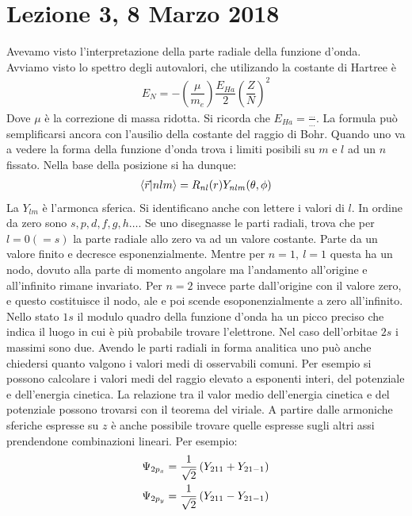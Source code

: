 \documentclass[../AppuntiStruttura.tex]{subfiles}
\begin{document}
	\section*{Lezione 3, 8 Marzo 2018}
	
	Avevamo visto l'interpretazione della parte radiale della funzione d'onda. Avviamo visto lo spettro degli autovalori, che utilizando la costante di Hartree è
	\begin{gather*}
	E_N=-\left(\dfrac{\mu}{m_e}\right)\dfrac{E_{Ha}}{2}\left(\dfrac{Z}{N}\right)^{2}
	\end{gather*}
	Dove $ \mu $ è la correzione di massa ridotta. Si ricorda che $ E_{Ha}=\frac{...}{...} $. La formula può semplificarsi ancora con l'ausilio della costante del raggio di Bohr. Quando uno va a vedere la forma della funzione d'onda trova i limiti posibili su $ m $ e $ l $ ad un $ n $ fissato. Nella base della posizione si ha dunque:
	\begin{gather*}
	\braket{\vec{r}}{nlm}=R_{nl}(r)Y_{nlm}(\theta,\phi)
	\end{gather*}
	La $ Y_{lm} $ è l'armonca sferica. Si identificano anche con lettere i valori di $ l $. In ordine da zero sono $ s,p,d,f,g,h\dots $. Se uno disegnasse le parti radiali, trova che per $ l=0(=s) $ la parte radiale allo zero va ad un valore costante. Parte da un valore finito e decresce esponenzialmente. Mentre per $ n=1,\ l=1 $ questa ha un nodo, dovuto alla parte di momento angolare ma l'andamento all'origine e all'infinito rimane invariato. Per $ n=2 $ invece parte dall'origine con il valore zero, e questo costituisce il nodo, ale e poi scende esoponenzialmente a zero all'infinito. Nello stato $ 1s $ il modulo quadro della funzione d'onda ha un picco preciso che indica il luogo in cui è più probabile trovare l'elettrone. Nel caso dell'orbitae $ 2s $ i massimi sono due. Avendo le parti radiali in forma analitica uno può anche chiedersi quanto valgono i valori medi di osservabili comuni. Per esempio si possono calcolare i valori medi del raggio elevato a esponenti interi, del potenziale e dell'energia cinetica. La relazione tra il valor medio dell'energia cinetica e del potenziale possono trovarsi con il teorema del viriale. A partire dalle armoniche sferiche espresse su $ z $ è anche possibile trovare quelle espresse sugli altri assi prendendone combinazioni lineari. Per esempio:
	\begin{gather*}
	\Psi_{2p_x}=\dfrac{1}{\sqrt{2}}\left(Y_{211}+Y_{21-1}\right) \\
	\Psi_{2p_y}=\dfrac{1}{\sqrt{2}}\left(Y_{211}-Y_{21-1}\right)
	\end{gather*}
\end{document}
